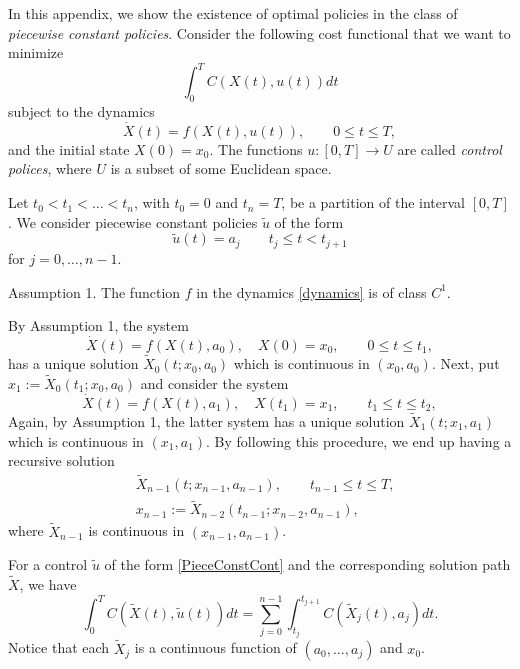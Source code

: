 In this appendix, we show the existence of optimal policies in the class of {\it piecewise constant policies}. Consider the following cost functional that we want to minimize
\begin{equation}\label{costFunctional}
  \int_0^T C(X(t),u(t)) dt
\end{equation}
subject to the dynamics
\begin{equation}\label{dynamics}
  \dot{X}(t) = f(X(t),u(t)),  \qquad    0\leq t \leq T,
\end{equation}
and the initial state $X(0)=x_0$. The functions $u:[0,T]\to U$ are called {\it control polices}, where $U$ is a subset of some Euclidean space.   %

Let $t_0<t_1<\ldots <t_n$, with
$t_0=0$ and $t_n=T$, be a partition of the interval $[0,T]$.
We consider piecewise constant policies $\tilde{u}$ of the form
\begin{equation}\label{PieceConstCont}
  \tilde{u}(t) = a_j\qquad t_j\leq t < t_{j+1}
\end{equation}
 for $j=0,\ldots,n-1$.

{\sc Assumption 1}. The function $f$ in the dynamics \eqref{dynamics} is of class $C^1$.

By Assumption 1, the system
\[
  \dot{X}(t) = f(X(t),a_0), \quad X(0)=x_0, \qquad    0\leq t \leq t_1,
\]
has a unique solution $\tilde{X}_0(t;x_0,a_0)$ which is continuous in
$(x_0,a_0)$.  Next, put $x_1:=\tilde{X}_0(t_1;x_0,a_0)$ and consider the system
\[
  \dot{X}(t) = f(X(t),a_1), \quad X(t_1)=x_1, \qquad    t_1\leq t \leq t_2,
\]
Again, by Assumption 1, the latter system has a unique solution $\tilde{X}_1(t;x_1,a_1)$ which is
continuous in $(x_1,a_1)$. By following this procedure, we end up having a
recursive solution
\begin{equation*}
  \begin{aligned}
    & \tilde{X}_{n-1}(t;x_{n-1},a_{n-1}), 
    \qquad t_{n-1}\leq t \leq T,\\
    & x_{n-1}:=\tilde{X}_{n-2}(t_{n-1};x_{n-2},a_{n-1}),
  \end{aligned}
\end{equation*}
where $\tilde{X}_{n-1}$ is continuous in $(x_{n-1},a_{n-1})$.


For a control $\tilde{u}$ of the form \eqref{PieceConstCont} and the
corresponding solution path $\tilde{X}$, we have
\[
  \int_0^T
    C(\tilde{X}(t),
    \tilde{u}(t)) dt =
      \sum_{j=0}^{n-1}
        \int_{t_j}^{t_{j+1}}
        C(\tilde{X}_j(t),a_j) dt.
\]
Notice that each $\tilde{X}_j$ is a continuous function of $(a_0,\ldots,a_j)$
and $x_0$. 


